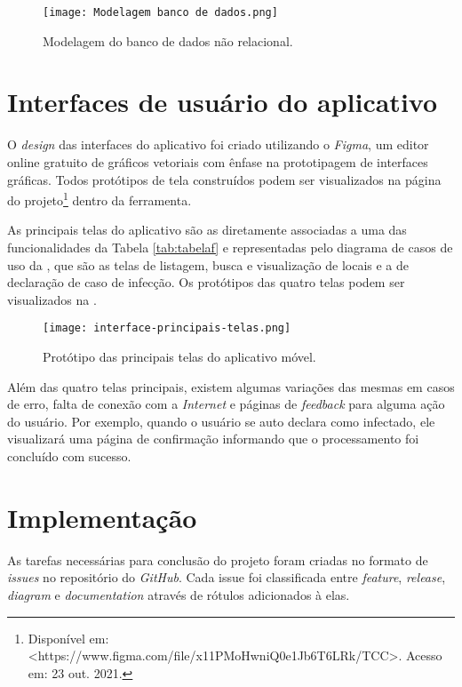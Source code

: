 \begin{figure}[!htb]
  \centering
  \texttt{[image: Modelagem banco de dados.png]}
  \caption{Modelagem do banco de dados não relacional.}
  \label{fig:modelagemfirestore}
\end{figure}

\section{Interfaces de usuário do aplicativo}\label{sec:uiux}
O \textit{design} das interfaces do aplicativo foi criado utilizando o \textit{Figma}, um editor online gratuito de gráficos vetoriais com ênfase na prototipagem de interfaces gráficas. Todos protótipos de tela construídos podem ser visualizados na página do projeto\footnote{Disponível em: <https://www.figma.com/file/x11PMoHwniQ0e1Jb6T6LRk/TCC>. Acesso em: 23 out. 2021.} dentro da ferramenta. 

As principais telas do aplicativo são as diretamente associadas a uma das funcionalidades da Tabela \ref{tab:tabelaf} e representadas pelo diagrama de casos de uso da , que são as telas de listagem, busca e visualização de locais e a de declaração de caso de infecção. Os protótipos das quatro telas podem ser visualizados na .

\begin{figure}[!htb]
  \centering
  \texttt{[image: interface-principais-telas.png]}
  \caption{Protótipo das principais telas do aplicativo móvel.}
  \label{fig:principaistelas}
\end{figure}

Além das quatro telas principais, existem algumas variações das mesmas em casos de erro, falta de conexão com a \textit{Internet} e páginas de \textit{feedback} para alguma ação do usuário. Por exemplo, quando o usuário se auto declara como infectado, ele visualizará uma página de confirmação informando que o processamento foi concluído com sucesso.

\section{Implementação}\label{sec:implementacao}

As tarefas necessárias para conclusão do projeto foram criadas no formato de \textit{issues} no repositório do \textit{GitHub}. Cada issue foi classificada entre \textit{feature}, \textit{release}, \textit{diagram} e \textit{documentation} através de rótulos adicionados à elas.

